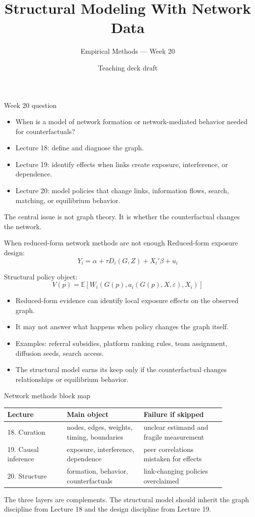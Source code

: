 \documentclass[aspectratio=169,11pt]{beamer}
\title{Structural Modeling With Network Data}
\subtitle{Empirical Methods --- Week 20}
\author{Teaching deck draft}
\date{}
\newcommand{\E}{\mathbb{E}}
\newcommand{\1}{\mathbf{1}}
\begin{document}
\begin{frame}
  \titlepage
\end{frame}

\begin{frame}{Week 20 question}
\begin{itemize}
    \item When is a model of network formation or network-mediated behavior needed for counterfactuals?
    \item Lecture 18: define and diagnose the graph.
    \item Lecture 19: identify effects when links create exposure, interference, or dependence.
    \item Lecture 20: model policies that change links, information flows, search, matching, or equilibrium behavior.
\end{itemize}

\medskip
The central issue is not graph theory. It is whether the counterfactual changes the network.
\end{frame}

\begin{frame}{When reduced-form network methods are not enough}
\small
Reduced-form exposure design:
\[
Y_i = \alpha + \tau D_i(G,Z) + X_i'\beta + u_i
\]

Structural policy object:
\[
V(p)=\E\left[
W_i\left(G(p),a_i(G(p),X,\varepsilon),X_i\right)
\right]
\]

\begin{itemize}
    \item Reduced-form evidence can identify local exposure effects on the observed graph.
    \item It may not answer what happens when policy changes the graph itself.
    \item Examples: referral subsidies, platform ranking rules, team assignment, diffusion seeds, search access.
    \item The structural model earns its keep only if the counterfactual changes relationships or equilibrium behavior.
\end{itemize}
\end{frame}

\begin{frame}{Network methods block map}
\small
\begin{tabular}{p{0.24\linewidth} p{0.31\linewidth} p{0.33\linewidth}}
\toprule
Lecture & Main object & Failure if skipped \\
\midrule
18. Curation & nodes, edges, weights, timing, boundaries & unclear estimand and fragile measurement \\
19. Causal inference & exposure, interference, dependence & peer correlations mistaken for effects \\
20. Structure & formation, behavior, counterfactuals & link-changing policies overclaimed \\
\bottomrule
\end{tabular}

\medskip
The three layers are complements. The structural model should inherit the graph discipline from Lecture 18 and the design discipline from Lecture 19.
\end{frame}
\end{document}
